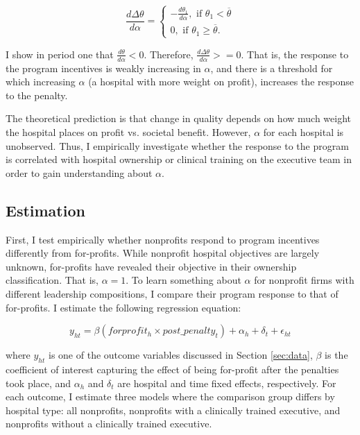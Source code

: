 \documentclass[12pt]{article}
\begin{document}
    $$\frac{d\Delta\theta}{d\alpha} = \begin{cases}
        -\frac{d\theta_1}{d\alpha}, \text{  if  } \theta_1<\overline{\theta}\\
        0, \text{  if  } \theta_1\geq \overline{\theta}.
    \end{cases}$$

    I show in period one that $\frac{d\theta}{d\alpha}<0$. Therefore, $\frac{d\Delta\theta}{d\alpha}>=0$. That is, the response to the program incentives is weakly increasing in $\alpha$, and there is a threshold for which increasing $\alpha$ (a hospital with more weight on profit), increases the response to the penalty. 

    The theoretical prediction is that change in quality depends on how much weight the hospital places on profit vs. societal benefit. However, $\alpha$ for each hospital is unobserved. Thus, I empirically investigate whether the response to the program is correlated with hospital ownership or clinical training on the executive team in order to gain understanding about $\alpha$. 

    \subsection{Estimation}

    First, I test empirically whether nonprofits respond to program incentives differently from for-profits. While nonprofit hospital objectives are largely unknown, for-profits have revealed their objective in their ownership classification. That is, $\alpha=1$. To learn something about $\alpha$ for nonprofit firms with different leadership compositions, I compare their program response to that of for-profits. I estimate the following regression equation:

    \begin{equation}
    \label{eq:forprofit}
    y_{ht} = \beta (forprofit_h \times post\_penalty_t) + \alpha_{h} + \delta_t + \epsilon_{ht}
    \end{equation}

    \noindent where $y_{ht}$ is one of the outcome variables discussed in Section \ref{sec:data}, $\beta$ is the coefficient of interest capturing the effect of being for-profit after the penalties took place, and $\alpha_h$ and $\delta_t$ are hospital and time fixed effects, respectively. For each outcome, I estimate three models where the comparison group differs by hospital type: all nonprofits, nonprofits with a clinically trained executive, and nonprofits without a clinically trained executive.
\end{document}
